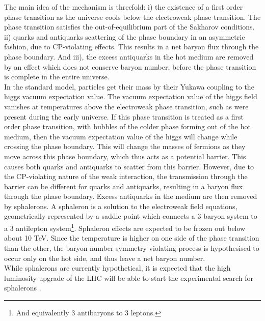 The main idea of the mechanism is threefold: i) the existence of a first order phase transition as the universe cools below the electroweak phase transition. The phase transition satisfies the out-of-equilibrium part of the Sakharov conditions. ii) quarks and antiquarks scattering of the phase boundary in an asymmetric fashion, due to CP-violating effects. This results in a net baryon flux through the phase boundary. And iii), the excess antiquarks in the hot medium are removed by an effect which does not conserve baryon number, before the phase transition is complete in the entire universe. \\
In the standard model, particles get their mass by their Yukawa coupling to the higgs vacuum expectation value\cite{SANTAMARIA199390}. The vacuum expectation value of the higgs field vanishes at temperatures above the electroweak phase transition, such as were present during the early universe\cite{Higgs_vev_highT}. If this phase transition is treated as a first order phase transition, with bubbles of the colder phase forming out of the hot medium, then the vacuum expectation value of the higgs will change while crossing the phase boundary. This will change the masses of fermions as they move across this phase boundary, which thus acts as a potential barrier. This causes both quarks and antiquarks to scatter from this barrier. However, due to the CP-violating nature of the weak interaction, the transmission through the barrier can be different for quarks and antiquarks, resulting in a baryon flux through the phase boundary. Excess antiquarks in the medium are then removed by sphalerons. A sphaleron is a solution to the electroweak field equations, geometrically represented by a saddle point which connects a 3 baryon system to a 3 antilepton system\footnote{And equivalently 3 antibaryons to 3 leptons.}\cite{Phong_2020}. Sphaleron effects are expected to be frozen out below about 10 TeV. Since the temperature is higher on one side of the phase transition than the other, the baryon number symmetry violating process is hypothesised to occur only on the hot side, and thus leave a net baryon number.  \\

While sphalerons are currently hypothetical, it is expected that the high luminosity upgrade of the LHC will be able to start the experimental search for sphalerons \cite{Papaefstathiou_2019}.


